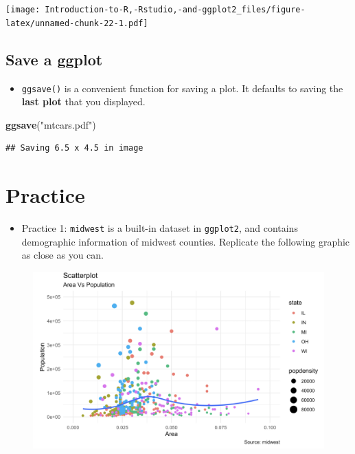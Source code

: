 \documentclass[]{book}
\newenvironment{Shaded}{\begin{snugshade}}{\end{snugshade}}
\newcommand{\KeywordTok}[1]{\textcolor[rgb]{0.13,0.29,0.53}{\textbf{{#1}}}}
\newcommand{\StringTok}[1]{\textcolor[rgb]{0.31,0.60,0.02}{{#1}}}
\newcommand{\NormalTok}[1]{{#1}}
\providecommand{\tightlist}{%
  \setlength{\itemsep}{0pt}\setlength{\parskip}{0pt}}
\begin{document}
\texttt{[image: Introduction-to-R,-Rstudio,-and-ggplot2\_files/figure-latex/unnamed-chunk-22-1.pdf]}

\section{Save a ggplot}\label{save-a-ggplot}

\begin{itemize}
\tightlist
\item
  \texttt{ggsave()} is a convenient function for saving a plot. It
  defaults to saving the \textbf{last plot} that you displayed.
\end{itemize}

\begin{Shaded}
\begin{Highlighting}[]
\KeywordTok{ggsave}\NormalTok{(}\StringTok{"mtcars.pdf"}\NormalTok{)}
\end{Highlighting}
\end{Shaded}

\begin{verbatim}
## Saving 6.5 x 4.5 in image
\end{verbatim}

\chapter{Practice}\label{practice}

\begin{itemize}
\tightlist
\item
  Practice 1: \texttt{midwest} is a built-in dataset in
  \texttt{ggplot2}, and contains demographic information of midwest
  counties. Replicate the following graphic as close as you can.
\end{itemize}

\begin{figure}[htbp]
\centering
\includegraphics{practice1.png}
\caption{}
\end{figure}


\end{document}
